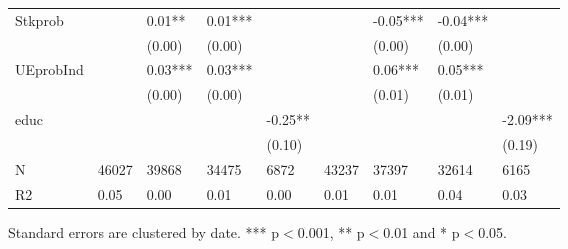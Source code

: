 \documentclass[12pt,notitlepage,onecolumn,aps,pra]{revtex4-1}
\begin{document}
\begin{table}[ht]
\begin{adjustbox}{width={15cm},totalheight={20cm}}
\begin{threeparttable}
\begin{tabular}{lllllllll}
Stkprob            &           &     0.01** &     0.01*** &              &            &    -0.05*** &     -0.04*** &               \\
                   &           &     (0.00) &      (0.00) &              &            &      (0.00) &       (0.00) &               \\
UEprobInd          &           &    0.03*** &     0.03*** &              &            &     0.06*** &      0.05*** &               \\
                   &           &     (0.00) &      (0.00) &              &            &      (0.01) &       (0.01) &               \\
educ               &           &            &             &      -0.25** &            &             &              &      -2.09*** \\
                   &           &            &             &       (0.10) &            &             &              &        (0.19) \\
N                  &     46027 &      39868 &       34475 &         6872 &      43237 &       37397 &        32614 &          6165 \\
R2                 &      0.05 &       0.00 &        0.01 &         0.00 &       0.01 &        0.01 &         0.04 &          0.03 \\
\bottomrule
\end{tabular}
\begin{tablenotes}\item Standard errors are clustered by date. *** p$<$0.001, ** p$<$0.01 and * p$<$0.05. 
\end{tablenotes}
\end{threeparttable}
\end{adjustbox}
\end{table}
\end{document}
